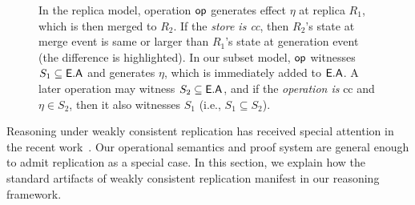 \begin{figure}
{}
\hspace*{0.1in}
 \caption{In the replica model, operation $\textsf{op}$ generates effect
$\eta$ at replica $R_1$, which is then merged to $R_2$. If the
\emph{store is {\sc cc}}, then $R_2$'s state at merge event is same or
larger than $R_1$'s state at generation event (the difference is
highlighted). In our subset model, $\textsf{op}$ witnesses $S_1 \subseteq
\textsf{E}.\textsf{A}$ and generates $\eta$, which is immediately added to $\textsf{E}.\textsf{A}$. A
later operation may witness $S_2 \subseteq \textsf{E}.\textsf{A}$, and if the
\emph{operation is} {\sc cc} and $\eta \in S_2$, then it also
witnesses $S_1$ (i.e., $S_1 \subseteq S_2$). } 
\label{fig:ec-theirs-vs-ours}
\end{figure}

Reasoning under weakly consistent replication has received special
attention in the recent work~\cite{gotsmanpopl16}. Our operational
semantics and proof system are general enough to admit replication as
a special case. In this section, we explain how the standard artifacts
of weakly consistent replication manifest in our reasoning framework.

